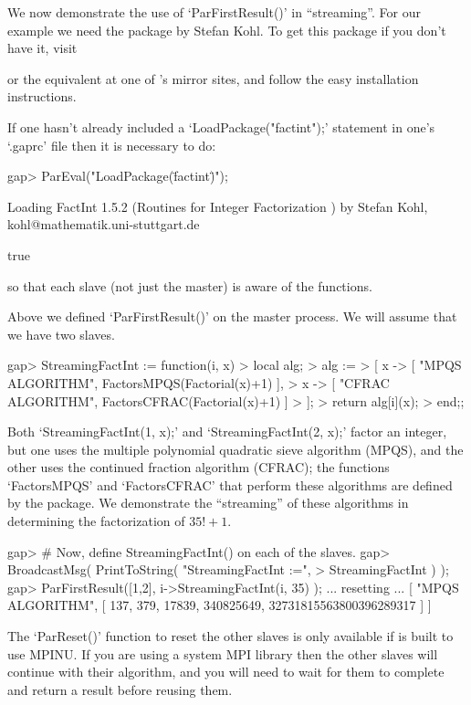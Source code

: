 We now demonstrate the use of `ParFirstResult()'  in  ``streaming''.  For
our example we need the  package by Stefan Kohl. To  get
this package if you don't have it, visit

or the equivalent at one of {\GAP}'s mirror sites, and  follow  the  easy
installation instructions.

If one hasn't already included a  `LoadPackage("factint");'  statement
in one's `.gaprc' file then it is necessary to do:

\beginexample
gap> ParEval("LoadPackage(\"factint\")");

Loading FactInt 1.5.2 (Routines for Integer Factorization )
by Stefan Kohl, kohl@mathematik.uni-stuttgart.de

true
\endexample

so  that  each  slave  (not  just   the   master)   is   aware   of   the
 functions.

Above we defined `ParFirstResult()' on the master process. We will assume
that we have two slaves.

\beginexample
gap> StreamingFactInt := function(i, x)
>   local alg;
>   alg :=
>    [ x -> [ "MPQS ALGORITHM",  FactorsMPQS(Factorial(x)+1) ],
>      x -> [ "CFRAC ALGORITHM", FactorsCFRAC(Factorial(x)+1) ]
>    ];
>   return alg[i](x);
> end;;
\endexample

Both `StreamingFactInt(1, x);' and `StreamingFactInt(2,  x);'  factor  an
integer, but one uses the multiple polynomial quadratic  sieve  algorithm
(MPQS), and the other uses the continued fraction algorithm (CFRAC);  the
functions `FactorsMPQS' and `FactorsCFRAC' that perform these  algorithms
are  defined  by  the    package.  We  demonstrate   the
``streaming'' of these algorithms in  determining  the  factorization  of
$35!+1$.

\beginexample
gap> # Now, define StreamingFactInt() on each of the slaves.
gap> BroadcastMsg( PrintToString( "StreamingFactInt :=",
>                                 StreamingFactInt ) );
gap> ParFirstResult([1,2], i->StreamingFactInt(i, 35) );
... resetting ...
[ "MPQS ALGORITHM", [ 137, 379, 17839, 340825649, 32731815563800396289317 ] ]
\endexample

The `ParReset()' function to reset the other slaves is only available if 
{\ParGAP} is built to use MPINU. If you are using a system MPI library then 
the other slaves will continue with their algorithm, and you will need to 
wait for them to complete and return a result before reusing them. 



